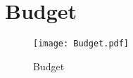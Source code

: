 \appendixpagenumbering
\chapter{Budget} \label{App:Budget}

\begin{figure}[H]
\texttt{[image: Budget.pdf]}
\caption[]{Budget}
\label{fig:budget}
\end{figure}
